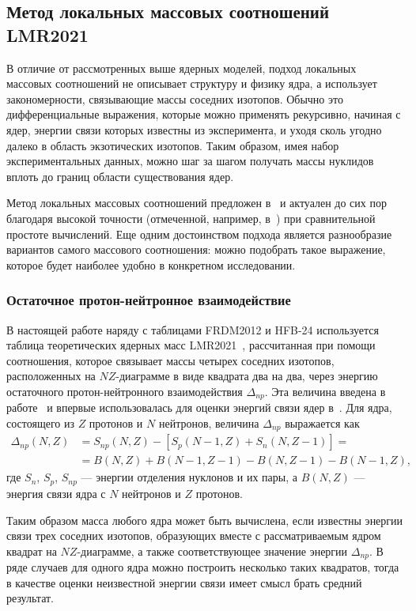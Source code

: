 \subsection{Метод локальных массовых соотношений LMR2021}
В отличие от рассмотренных выше ядерных моделей, подход локальных массовых соотношений не описывает структуру и физику ядра, а использует закономерности, связывающие массы соседних изотопов. Обычно это дифференциальные выражения, которые можно применять рекурсивно, начиная с ядер, энергии связи которых известны из эксперимента, и уходя сколь угодно далеко в область экзотических изотопов. Таким образом, имея набор экспериментальных данных, можно шаг за шагом получать массы нуклидов вплоть до границ области существования ядер.

Метод локальных массовых соотношений предложен в~\cite{garvey1966} и актуален до сих пор благодаря высокой точности (отмеченной, например, в~\cite{bao2014}) при сравнительной простоте вычислений. Еще одним достоинством подхода является разнообразие вариантов самого массового соотношения: можно подобрать такое выражение, которое будет наиболее удобно в конкретном исследовании.

\subsubsection{Остаточное протон-нейтронное взаимодействие}
В настоящей работе наряду с таблицами FRDM2012 и HFB-24 используется таблица теоретических ядерных масс LMR2021~\cite{vladimirova2022}, рассчитанная при помощи соотношения, которое связывает массы четырех соседних изотопов, расположенных на $NZ$-диаграмме в виде квадрата два на два, через энергию остаточного протон-нейтронного взаимодействия $\Delta_{np}$. Эта величина введена в работе~\cite{kravtsov1959} и впервые использовалась для оценки энергий связи ядер в~\cite{janecke1974}. Для ядра, состоящего из $Z$ протонов и $N$ нейтронов, величина $\Delta_{np}$ выражается как
\begin{equation}\label{eq:np-interaction}
  \begin{aligned}
    \Delta_{np}(N,Z) &= S_{np}(N,Z) - [S_{p}(N-1,Z) + S_{n}(N,Z-1)] = \\
    &= B(N,Z) + B(N-1,Z-1) - B(N,Z-1) - B(N-1,Z),
  \end{aligned}
\end{equation}
где $S_n$, $S_p$, $S_{np}$ --- энергии отделения нуклонов и их пары, а $B(N,Z)$ --- энергия связи ядра с $N$ нейтронов и $Z$ протонов.

Таким образом масса любого ядра может быть вычислена, если известны энергии связи трех соседних изотопов, образующих вместе с рассматриваемым ядром квадрат на $NZ$-диаграмме, а также соответствующее значение энергии $\Delta_{np}$. В ряде случаев для одного ядра можно построить несколько таких квадратов, тогда в качестве оценки неизвестной энергии связи имеет смысл брать средний результат.


